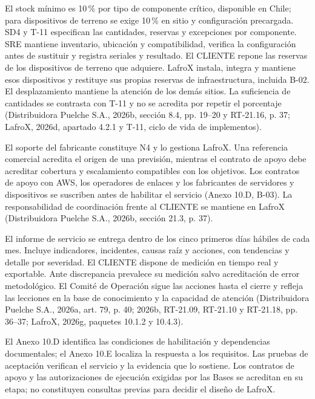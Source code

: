 El stock mínimo es 10\,\% por tipo de componente crítico, disponible en Chile; para dispositivos de terreno se exige 10\,\% en sitio y configuración precargada. SD4 y T-11 especifican las cantidades, reservas y excepciones por componente. SRE mantiene inventario, ubicación y compatibilidad, verifica la configuración antes de sustituir y registra seriales y resultado. El CLIENTE repone las reservas de los dispositivos de terreno que adquiere. LafroX instala, integra y mantiene esos dispositivos y restituye sus propias reservas de infraestructura, incluida B-02. El desplazamiento mantiene la atención de los demás sitios. La suficiencia de cantidades se contrasta con T-11 y no se acredita por repetir el porcentaje (Distribuidora Puelche S.A., 2026b, sección 8.4, pp. 19--20 y RT-21.16, p. 37; LafroX, 2026d, apartado 4.2.1 y T-11, ciclo de vida de implementos).

El soporte del fabricante constituye N4 y lo gestiona LafroX. Una referencia comercial acredita el origen de una previsión, mientras el contrato de apoyo debe acreditar cobertura y escalamiento compatibles con los objetivos. Los contratos de apoyo con AWS, los operadores de enlaces y los fabricantes de servidores y dispositivos se suscriben antes de habilitar el servicio (Anexo 10.D, B-03). La responsabilidad de coordinación frente al CLIENTE se mantiene en LafroX (Distribuidora Puelche S.A., 2026b, sección 21.3, p. 37).

El informe de servicio se entrega dentro de los cinco primeros días hábiles de cada mes. Incluye indicadores, incidentes, causas raíz y acciones, con tendencias y detalle por severidad. El CLIENTE dispone de medición en tiempo real y exportable. Ante discrepancia prevalece su medición salvo acreditación de error metodológico. El Comité de Operación sigue las acciones hasta el cierre y refleja las lecciones en la base de conocimiento y la capacidad de atención (Distribuidora Puelche S.A., 2026a, art. 79, p. 40; 2026b, RT-21.09, RT-21.10 y RT-21.18, pp. 36--37; LafroX, 2026g, paquetes 10.1.2 y 10.4.3).

El Anexo 10.D identifica las condiciones de habilitación y dependencias documentales; el Anexo 10.E localiza la respuesta a los requisitos. Las pruebas de aceptación verifican el servicio y la evidencia que lo sostiene. Los contratos de apoyo y las autorizaciones de ejecución exigidas por las Bases se acreditan en su etapa; no constituyen consultas previas para decidir el diseño de LafroX.
